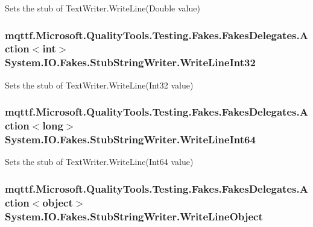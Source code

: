 Sets the stub of Text\-Writer.\-Write\-Line(\-Double value)

\hypertarget{class_system_1_1_i_o_1_1_fakes_1_1_stub_string_writer_a69d3ac1d06350257bf9f1cb74667c573}{
\subsubsection[{Write\-Line\-Int32}]{\setlength{\rightskip}{0pt plus 5cm}mqttf.\-Microsoft.\-Quality\-Tools.\-Testing.\-Fakes.\-Fakes\-Delegates.\-Action$<$int$>$ System.\-I\-O.\-Fakes.\-Stub\-String\-Writer.\-Write\-Line\-Int32}}\label{class_system_1_1_i_o_1_1_fakes_1_1_stub_string_writer_a69d3ac1d06350257bf9f1cb74667c573}


Sets the stub of Text\-Writer.\-Write\-Line(\-Int32 value)

\hypertarget{class_system_1_1_i_o_1_1_fakes_1_1_stub_string_writer_a27744148770d2f65e06b49a8e32315ca}{
\subsubsection[{Write\-Line\-Int64}]{\setlength{\rightskip}{0pt plus 5cm}mqttf.\-Microsoft.\-Quality\-Tools.\-Testing.\-Fakes.\-Fakes\-Delegates.\-Action$<$long$>$ System.\-I\-O.\-Fakes.\-Stub\-String\-Writer.\-Write\-Line\-Int64}}\label{class_system_1_1_i_o_1_1_fakes_1_1_stub_string_writer_a27744148770d2f65e06b49a8e32315ca}


Sets the stub of Text\-Writer.\-Write\-Line(\-Int64 value)

\hypertarget{class_system_1_1_i_o_1_1_fakes_1_1_stub_string_writer_a6bdb6f902fb3e896f0d79416c2faa012}{
\subsubsection[{Write\-Line\-Object}]{\setlength{\rightskip}{0pt plus 5cm}mqttf.\-Microsoft.\-Quality\-Tools.\-Testing.\-Fakes.\-Fakes\-Delegates.\-Action$<$object$>$ System.\-I\-O.\-Fakes.\-Stub\-String\-Writer.\-Write\-Line\-Object}}\label{class_system_1_1_i_o_1_1_fakes_1_1_stub_string_writer_a6bdb6f902fb3e896f0d79416c2faa012}


